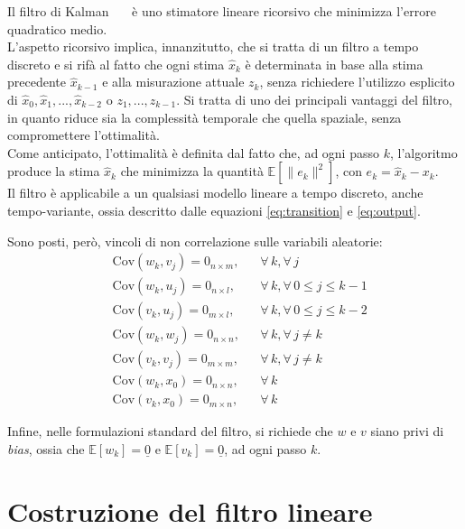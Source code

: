 \documentclass[12pt,a4paper,openright,twoside]{book}
\begin{document}
Il filtro di Kalman~\cite{10.1115/1.3662552}~\cite{WelchB95}~\cite{10.1145/3363294} è uno stimatore lineare ricorsivo che minimizza l'errore quadratico medio. \\
L'aspetto ricorsivo implica, innanzitutto, che si tratta di un filtro a tempo discreto e si rifà al fatto che ogni stima $\hat{x}_k$ è determinata in base alla stima precedente $\hat{x}_{k-1}$ e alla misurazione attuale $z_k$, senza richiedere l'utilizzo esplicito di $\hat{x}_0,\hat{x}_1,...,\hat{x}_{k-2}$ o $z_1,...,z_{k-1}$. Si tratta di uno dei principali vantaggi del filtro, in quanto riduce sia la complessità temporale che quella spaziale, senza compromettere l'ottimalità. \\
Come anticipato, l'ottimalità è definita dal fatto che, ad ogni passo $k$, l'algoritmo produce la stima $\hat{x}_k$ che minimizza la quantità $\mathbb{E}[\lVert e_k\rVert^2]$, con $e_k=\hat{x}_k-x_k$. \\

Il filtro è applicabile a un qualsiasi modello lineare a tempo discreto, anche tempo-variante, ossia descritto dalle equazioni \ref{eq:transition} e \ref{eq:output}.

Sono posti, però, vincoli di non correlazione sulle variabili aleatorie:
\begin{align*}
& \mathrm{Cov}(w_k,v_j)=0_{n\times m}, && \forall\,k,\forall\,j \\
& \mathrm{Cov}(w_k,u_j)=0_{n\times l}, && \forall\,k,\forall\,0\leq j\leq k-1 \\
& \mathrm{Cov}(v_k,u_j)=0_{m\times l}, && \forall\,k,\forall\,0\leq j\leq k-2 \\
& \mathrm{Cov}(w_k,w_j)=0_{n\times n}, && \forall\,k,\forall\,j\neq k \\
& \mathrm{Cov}(v_k,v_j)=0_{m\times m}, && \forall\,k,\forall\,j\neq k \\
& \mathrm{Cov}(w_k,x_0)=0_{n\times n}, && \forall\,k \\
& \mathrm{Cov}(v_k,x_0)=0_{m\times n}, && \forall\,k
\end{align*}

Infine, nelle formulazioni standard del filtro, si richiede che $w$ e $v$ siano privi di \textit{bias}, ossia che $\mathbb{E}[w_k]=\underline{0}$ e $\mathbb{E}[v_k]=\underline{0}$, ad ogni passo $k$.

\section{Costruzione del filtro lineare}
\end{document}
